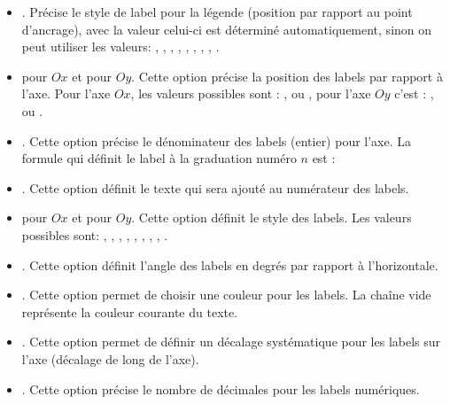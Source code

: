 \begin{itemize}
\begin{itemize}
            \item {}. Précise le style de label pour la légende (position par rapport au point d'ancrage), avec la valeur  celui-ci est déterminé automatiquement, sinon on peut utiliser les valeurs: , , , , , , , , .
            
            \item {} pour $Ox$ et  pour $Oy$. Cette option précise la position des labels par rapport à l'axe. Pour l'axe $Ox$, les valeurs possibles sont : ,  ou , pour l'axe $Oy$ c'est :  ,  ou .
            
            \item {}. Cette option précise le dénominateur des labels (entier) pour l'axe. La formule qui définit le label à la graduation numéro $n$ est : 
            
            \item {}. Cette option définit le texte qui sera ajouté au numérateur des labels.
            
            \item {} pour $Ox$ et  pour $Oy$. Cette option définit le style des labels. Les valeurs possibles sont: , , , , , , , , .
            
            \item {}. Cette option définit l'angle des labels en degrés par rapport à l'horizontale.
            
            \item {}. Cette option permet de choisir une couleur pour les labels. La chaîne vide représente la couleur courante du texte.
            
            \item {}. Cette option permet de définir un décalage systématique pour les labels sur l'axe (décalage de long de l'axe).
            
            \item {}. Cette option précise le nombre de décimales pour les labels numériques.
            

\end{itemize}
\end{itemize}

